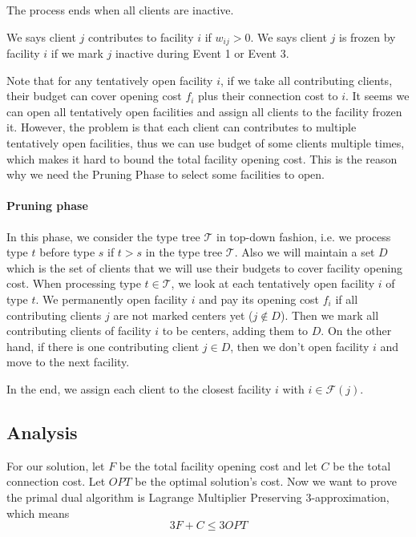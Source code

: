 The process ends when all clients are inactive.

\begin{defn}
We says client $j$ contributes to facility $i$ if $w_{ij} > 0$.
We says client $j$ is frozen by facility $i$ if we mark $j$ inactive during Event 1 or Event 3.
\end{defn}

Note that for any tentatively open facility $i$, if we take all contributing clients,
their budget can cover opening cost $f_i$ plus their connection cost to $i$.
It seems we can open all tentatively open facilities and assign all clients to the facility frozen it.
However, the problem is that each client can contributes to multiple tentatively open facilities,
thus we can use budget of some clients multiple times, which makes it hard to bound the total facility opening cost.
This is the reason why we need the Pruning Phase to select some facilities to open.

\paragraph{Pruning phase}

In this phase, we consider the type tree $\mathcal{T}$ in top-down fashion,
i.e. we process type $t$ before type $s$ if $t > s$ in the type tree $\mathcal{T}$.
Also we will maintain a set $D$ which is the set of clients that we will use their budgets to cover facility opening cost.
When processing type $t \in \mathcal{T}$, we look at each tentatively open facility $i$ of type $t$.
We permanently open facility $i$ and pay its opening cost $f_i$
if all contributing clients $j$ are not marked centers yet ($j \not \in D$).
Then we mark all contributing clients of facility $i$ to be centers, adding them to $D$.
On the other hand, if there is one contributing client $j \in D$, then we don't open facility $i$ and move to the next facility.

In the end, we assign each client to the closest facility $i$ with $i \in \mathcal{F}(j)$.

\subsection{Analysis}

For our solution, let $F$ be the total facility opening cost and let $C$ be the total connection cost.
Let $OPT$ be the optimal solution's cost.
Now we want to prove the primal dual algorithm is Lagrange Multiplier Preserving 3-approximation, which means
\[  3F + C \le 3 OPT    \]

